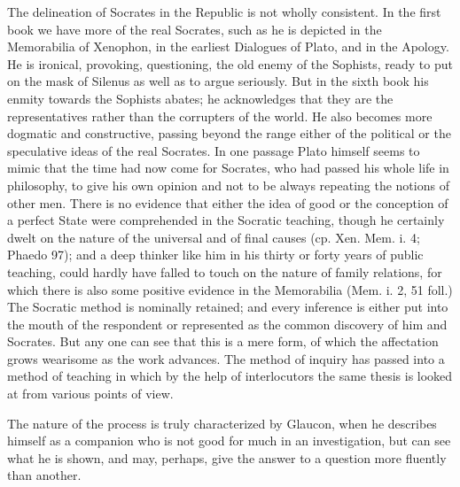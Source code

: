 The delineation of Socrates in the Republic is not wholly consistent. In the first book we have more of the real Socrates, such as he is depicted in the Memorabilia of Xenophon, in the earliest Dialogues of Plato, and in the Apology. He is ironical, provoking, questioning, the old enemy of the Sophists, ready to put on the mask of Silenus as well as to argue seriously. But in the sixth book his enmity towards the Sophists abates; he acknowledges that they are the representatives rather than the corrupters of the world. He also becomes more dogmatic and constructive, passing beyond the range either of the political or the speculative ideas of the real Socrates. In one passage Plato himself seems to mimic that the time had now come for Socrates, who had passed his whole life in philosophy, to give his own opinion and not to be always repeating the notions of other men. There is no evidence that either the idea of good or the conception of a perfect State were comprehended in the Socratic teaching, though he certainly dwelt on the nature of the universal and of final causes (cp. Xen. Mem. i. 4; Phaedo 97); and a deep thinker like him in his thirty or forty years of public teaching, could hardly have falled to touch on the nature of family relations, for which there is also some positive evidence in the Memorabilia (Mem. i. 2, 51 foll.) The Socratic method is nominally retained; and every inference is either put into the mouth of the respondent or represented as the common discovery of him and Socrates. But any one can see that this is a mere form, of which the affectation grows wearisome as the work advances. The method of inquiry has passed into a method of teaching in which by the help of interlocutors the same thesis is looked at from various points of view.

The nature of the process is truly characterized by Glaucon, when he describes himself as a companion who is not good for much in an investigation, but can see what he is shown, and may, perhaps, give the answer to a question more fluently than another.

